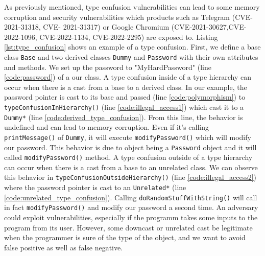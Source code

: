\documentclass[a4paper,11pt,oneside]{report}
\begin{document}
As previously mentioned, type confusion vulnerabilities can lead to some memory corruption and security vulnerabilities which products such as Telegram (CVE-2021-31318, CVE-
2021-31317) or Google Chromium (CVE-2021-30627,CVE-2022-1096, CVE-2022-1134, CVE-2022-2295) are exposed to. Listing \autoref{lst:type_confusion} shows an example of a type confusion.
First, we define a base class \texttt{Base} and two derived classes \texttt{Dummy} and \texttt{Password} with their own attributes and methods. We set up the password to "MyHardPassword" (line \ref{code:password}) of a our class. 
A type confusion inside of a type hierarchy can occur when there is a cast from a base to a derived class.
In our example, the password pointer is cast to its base and passed (line \ref{code:polymorphism}) to \texttt{typeConfusionInHierarchy()} (line \ref{code:illegal_access1}) which cast it to a \texttt{Dummy*} (line \ref{code:derived_type_confusion}). 
From this line, the behavior is undefined and can lead to memory corruption. Even if it's calling \texttt{printMessage()} of \texttt{Dummy}, it will execute \texttt{modifyPassword()} which will modify our password. 
This behavior is due to object being a \texttt{Password} object and it will called \texttt{modifyPassword()} method.
A type confusion outside of a type hierarchy can occur when there is a cast from a base to an unrelated class. 
We can observe this behavior in \texttt{typeConfusionOutsideHierarchy()} (line \ref{code:illegal_access2})  where the password pointer is cast to an \texttt{Unrelated*} (line \ref{code:unrelated_type_confusion}).
Calling \texttt{doRandomStuffWithString()} will call in fact \texttt{modifyPassword()} and modify our password a second time. 
An adversary could exploit vulnerabilities, especially if the programm takes some inputs to the program from its user. 
However, some downcast or unrelated cast be legitimate when the programmer is sure of the type of the object, and we want to avoid false positive as well as false negative.
\end{document}

